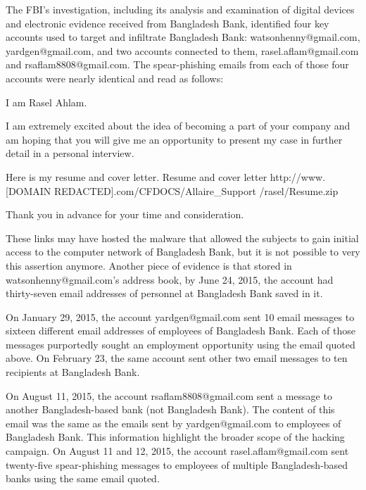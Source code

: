\documentclass[12pt]{article}
\begin{document}
        The FBI’s investigation, including its analysis and examination of digital devices and electronic evidence received from Bangladesh Bank, identified four key accounts used to target and infiltrate Bangladesh Bank:
        watsonhenny@gmail.com, yardgen@gmail.com, and two accounts connected to them, rasel.aflam@gmail.com and rsaflam8808@gmail.com.
        The spear-phishing emails from each of those four accounts were nearly identical and read as follows:
        \begin{displayquote}
        I am Rasel Ahlam.
        
        I am extremely excited about the idea of becoming a part of your company and am hoping that you will give me an opportunity to present my case in further detail in a personal interview.
        
        Here is my resume and cover letter. Resume and cover letter http://www.[DOMAIN REDACTED].com/CFDOCS/Allaire\_Support
        /rasel/Resume.zip
        
        Thank you in advance for your time and consideration. 
        \end{displayquote}
       
        These links may have hosted the malware that allowed the subjects to gain initial access to the computer network of Bangladesh Bank, but it is not possible to very this assertion anymore. Another piece of evidence is that stored in watsonhenny@gmail.com’s address book, by June 24, 2015, the account had thirty-seven email addresses of personnel at Bangladesh Bank saved in it.  
        
        On January 29, 2015, the account yardgen@gmail.com sent 10 email messages to sixteen different email addresses of employees of Bangladesh Bank. Each of those messages purportedly sought an employment opportunity using the email quoted above. On February 23, the same account sent other two email messages to ten recipients at Bangladesh Bank. 
        
        On August 11, 2015, the account rsaflam8808@gmail.com sent a message to another Bangladesh-based bank (not Bangladesh Bank). The content of this email was the same as the emails sent by yardgen@gmail.com to employees of Bangladesh Bank. This information highlight the broader scope of the hacking campaign. On August 11 and 12, 2015, the account rasel.aflam@gmail.com sent twenty-five spear-phishing messages to employees of multiple Bangladesh-based banks using the same email quoted. 
        
\end{document}
